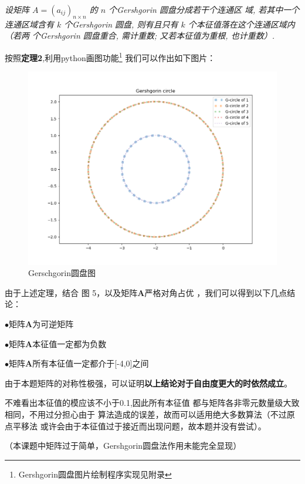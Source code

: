\documentclass[11pt, a4paper, oneside]{ctexart}
\begin{document}
{{{    \emph{设矩阵 $A=\left(a_{i j}\right)_{n \times n}$ 的 $n$ 个Gershgorin
    圆盘分成若干个连通区 域, 若其中一个连通区域含有 $k$ 个Gershgorin
    圆盘, 则有且只有 $k$ 个本征值落在这个连通区域内（若两 个Gershgorin
    圆盘重合, 需计重数; 又若本征值为重根, 也计重数）.
    }

    
    按照\textbf{定理2},利用python画图功能\footnote{Gershgorin圆盘图片绘制程序实现见附录}
    我们可以作出如下图片：
    \begin{figure}[h]
	
        \centering
        \vspace{4mm}
        \includegraphics[scale=0.55]{Gershgorin_circle.png}
        \caption{Gerschgorin圆盘图}
    \end{figure} 

由于上述定理，结合
图 5，以及矩阵$\boldsymbol{A}$严格对角占优
，我们可以得到以下几点结论：

$\bullet$矩阵$\boldsymbol{A}$为可逆矩阵

$\bullet$矩阵$\boldsymbol{A}$本征值一定都为负数

$\bullet$矩阵$\boldsymbol{A}$所有本征值一定都介于[-4,0]之间

由于本题矩阵的对称性极强，可以证明\cite{a}\textbf{以上结论对于自由度更大的时依然成立}。

不难看出本征值的模应该不小于0.1,因此所有本征值
都与矩阵各非零元数量级大致相同，不用过分担心由于
算法造成的误差，故而可以适用绝大多数算法（不过原点平移法
或许会由于本征值过于接近而出现问题，故本题并没有尝试）。

（本课题中矩阵过于简单，Gershgorin圆盘法作用未能完全显现）

}}}
\end{document}
